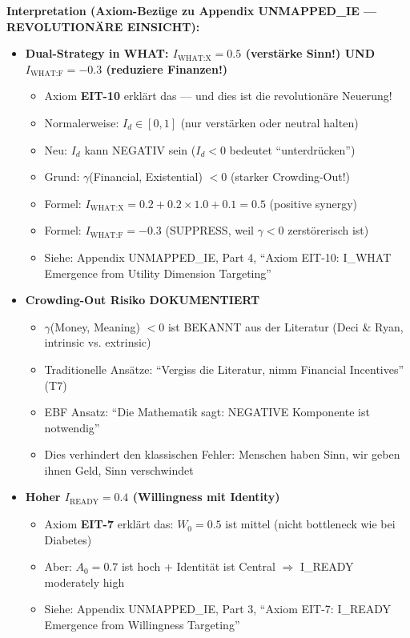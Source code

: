 \textbf{Interpretation (Axiom-Bezüge zu Appendix UNMAPPED_IE — REVOLUTIONÄRE EINSICHT):}
\begin{itemize}[nosep]
\item \textbf{Dual-Strategy in WHAT: $I_{\text{WHAT:X}} = 0.5$ (verstärke Sinn!) UND $I_{\text{WHAT:F}} = -0.3$ (reduziere Finanzen!)}
  \begin{itemize}[nosep]
  \item Axiom \textbf{EIT-10} erklärt das --- und dies ist die revolutionäre Neuerung!
  \item Normalerweise: $I_d \in [0, 1]$ (nur verstärken oder neutral halten)
  \item Neu: $I_d$ kann NEGATIV sein ($I_d < 0$ bedeutet ``unterdrücken'')
  \item Grund: $\gamma$(Financial, Existential) $< 0$ (starker Crowding-Out!)
  \item Formel: $I_{\text{WHAT:X}} = 0.2 + 0.2 \times 1.0 + 0.1 = 0.5$ (positive synergy)
  \item Formel: $I_{\text{WHAT:F}} = -0.3$ (SUPPRESS, weil $\gamma < 0$ zerstörerisch ist)
  \item Siehe: Appendix UNMAPPED_IE, Part 4, ``Axiom EIT-10: I_WHAT Emergence from Utility Dimension Targeting''
  \end{itemize}

\item \textbf{Crowding-Out Risiko DOKUMENTIERT}
  \begin{itemize}[nosep]
  \item $\gamma$(Money, Meaning) $< 0$ ist BEKANNT aus der Literatur (Deci \& Ryan, intrinsic vs. extrinsic)
  \item Traditionelle Ansätze: ``Vergiss die Literatur, nimm Financial Incentives'' (T7)
  \item EBF Ansatz: ``Die Mathematik sagt: NEGATIVE Komponente ist notwendig''
  \item Dies verhindert den klassischen Fehler: Menschen haben Sinn, wir geben ihnen Geld, Sinn verschwindet
  \end{itemize}

\item \textbf{Hoher $I_{\text{READY}} = 0.4$ (Willingness mit Identity)}
  \begin{itemize}[nosep]
  \item Axiom \textbf{EIT-7} erklärt das: $W_0 = 0.5$ ist mittel (nicht bottleneck wie bei Diabetes)
  \item Aber: $A_0 = 0.7$ ist hoch + Identität ist Central $\Rightarrow$ I_READY moderately high
  \item Siehe: Appendix UNMAPPED_IE, Part 3, ``Axiom EIT-7: I_READY Emergence from Willingness Targeting''
  \end{itemize}


\end{itemize}
